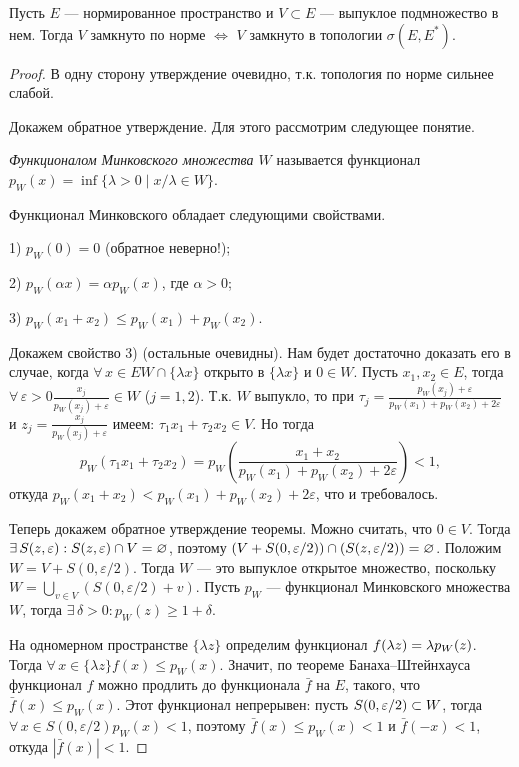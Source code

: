 \documentclass[12pt,titlepage, a4paper]{article}
\begin{document}
\begin{theorem}
Пусть $E$ --- нормированное пространство  и $V\subset E$ ---
выпуклое подмножество в нем. Тогда $V$ замкнуто по норме
$\Leftrightarrow$ $V$ замкнуто в топологии $\sigma(E, E^*)$.
\end{theorem}

\begin{proof}
В одну сторону утверждение очевидно, т.к. топология по норме сильнее
слабой.

Докажем обратное утверждение. Для этого рассмотрим следующее
понятие.

\begin{defen}
\emph{Функционалом Минковского множества $W$} называется функционал
$p_W(x)=\inf\{\lambda>0\mid x/\lambda\in W\}$.
\end{defen}

Функционал Минковского обладает следующими свойствами.

1) $p_W(0)=0$  (обратное неверно!);

2) $p_W(\alpha x)=\alpha p_W(x)$, где $\alpha>0$;

3) $p_W(x_1+x_2)\leqslant p_W(x_1)+p_W(x_2)$.

Докажем свойство 3) (остальные очевидны). Нам будет достаточно
доказать его в случае, когда $\forall\,x\in E$\;\;$W\cap\{\lambda
x\}$ открыто в $\{\lambda x\}$ и $0\in W$. Пусть $x_1,x_2\in E$,
тогда
$\forall\,\varepsilon>0$\;\;$\frac{x_j}{p_W(x_j)+\varepsilon}\in W$
($j=1,2$). Т.к. $W$ выпукло, то при
$\tau_j=\frac{p_W(x_j)+\varepsilon}{p_W(x_1)+p_W(x_2)+2\varepsilon}$
и $z_j=\frac{x_j}{p_W(x_j)+\varepsilon}$ имеем: $\tau_1
x_1+\tau_2x_2\in V$. Но тогда $$p_W(\tau_1 x_1+\tau_2x_2)=p_W\left(
\frac{x_1+x_2}{p_W(x_1)+p_W(x_2)+2\varepsilon}\right)<1,$$ откуда
$p_W(x_1+x_2)<p_W(x_1)+p_W(x_2)+2\varepsilon$, что и требовалось.

Теперь докажем обратное утверждение теоремы. Можно считать, что
$0\in V$. Тогда $\exists\,S(z,\varepsilon):S(z,\varepsilon)\p\cap
V=\varnothing$, поэтому
$(V+S(0,\varepsilon/2))\p\cap(S(z,\varepsilon/2))=\varnothing$.
Положим $W=V+S(0,\varepsilon/2)$. Тогда $W$ --- это выпуклое
открытое множество, поскольку $W=\bigcup\limits_{v\in
V}(S(0,\varepsilon/2)+v)$. Пусть $p_W$ --- функционал Минковского
множества $W$, тогда $\exists\,\delta>0:p_W(z)\geqslant 1+\delta$.

На одномерном пространстве $\{\lambda z\}$ определим функционал
$f(\lambda z)\p=\lambda p_W(z)$. Тогда $\forall\,x\in\{\lambda
z\}$\;\;$f(x)\leqslant p_W(x)$. Значит, по теореме
Банаха--Штейнхауса функционал $f$ можно продлить до функционала
$\bar{f}$ на $E$, такого, что $\bar{f}(x)\leqslant p_W(x)$. Этот
функционал непрерывен: пусть $S(0,\varepsilon/2)\p\subset W$, тогда
$\forall\,x\in S(0,\varepsilon/2)$\;\;$p_W(x)<1$, поэтому
$\bar{f}(x)\leqslant p_W(x)<1$ и $\bar{f}(-x)<1$, откуда
$|\bar{f}(x)|<1$.


\end{proof}
\end{document}
